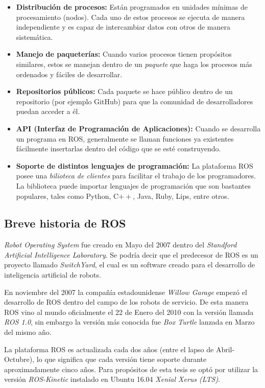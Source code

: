 \begin{itemize}
\item \textbf{Distribución de procesos:}
Están programados en unidades mínimas de procesamiento (nodos). Cada uno de estos procesos se ejecuta de manera independiente y es capaz de intercambiar datos con otros de manera sistemática.  
\item \textbf{Manejo de paqueterías:}
Cuando varios procesos tienen propósitos similares, estos se manejan dentro de un \textit{paquete} que haga los procesos más ordenados y fáciles de desarrollar.
\item \textbf{Repositorios públicos:}
Cada paquete se hace público dentro de un repositorio (por ejemplo GitHub) para que la comunidad de desarrolladores puedan acceder a él. 
\item \textbf{API (Interfaz de Programación de Aplicaciones):}
Cuando se desarrolla un programa en ROS, generalmente se llaman funciones ya existentes fácilmente insertarlas dentro del código que se esté construyendo.
\item \textbf{Soporte de distintos lenguajes de programación:}
La plataforma ROS posee una \textit{bilioteca de clientes} para facilitar el trabajo de los programadores. La biblioteca puede importar lenguajes de programación que son bastantes populares, tales como Python, C$++$, Java, Ruby, Lips, entre otros.
\end{itemize}
		\subsection*{Breve historia de ROS}
\textit{Robot Operating System} fue creado en Mayo del 2007 dentro del \textit{Standford Artificial Intelligence Laboratory}. Se podría decir que el predecesor de ROS es un proyecto llamado \textit{SwitchYard}, el cual es un software creado para el desarrollo de inteligencia artificial de robots.

En noviembre del 2007 la compañía estadounidense \textit{Willow Garage} empezó el desarrollo de ROS dentro del campo de los robots de servicio. De esta manera ROS vino al mundo oficialmente el 22 de Enero del 2010 con la versión llamada \textit{ROS 1.0}, sin embargo la versión más conocida fue \textit{Box Turtle} lanzada en Marzo del mismo año.

La plataforma ROS es actualizada cada dos años (entre el lapso de Abril-Octubre), lo que significa que cada versión tiene soporte durante aproximadamente cinco años. Para propósitos de esta tesis se optó por utilizar la versión \textit{ROS-Kinetic} instalado en Ubuntu 16.04 \textit{Xenial Xerus (LTS)}.

